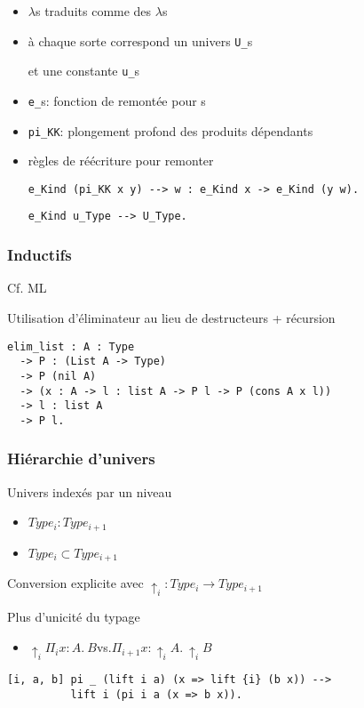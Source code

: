 \documentclass[12pt,aspectratio=169]{beamer}
\begin{document}
\begin{frame}[fragile]
\begin{itemize}
\item<2-> $\lambda$s traduits comme des $\lambda$s 
\item<3-> à chaque sorte  correspond un univers \verb;U_;\sort s
 \parbox{2cm}{\parbox{5cm}{et une constante \texttt{u\_}\sort s}}
\item<4-> \verb;e_;\sort s: fonction de remontée pour \sort s
\item<6-> \verb;pi_KK;: plongement profond des produits dépendants
\item<7-> règles de réécriture pour remonter

\verb;e_Kind (pi_KK x y) --> w : e_Kind x -> e_Kind (y w).;

\verb;e_Kind u_Type --> U_Type.;
\end{itemize}
\end{frame}

\begin{frame}[fragile]
  \frametitle{Inductifs}

  Cf. ML
  \bigskip

  Utilisation d'éliminateur au lieu de destructeurs + récursion

\begin{lstlisting}
elim_list : A : Type
  -> P : (List A -> Type)
  -> P (nil A)
  -> (x : A -> l : list A -> P l -> P (cons A x l))
  -> l : list A
  -> P l.
\end{lstlisting}
  
\end{frame}

\begin{frame}[fragile]
  \frametitle{Hiérarchie d'univers}
  Univers indexés par un niveau

  \begin{itemize}
  \item $Type_i : Type_{i+1}$

  \item $Type_i\subset Type_{i+1}$
  \end{itemize}
  \bigskip
  
  Conversion explicite avec $\uparrow_i : Type_i \to Type_{i+1}$
  \medskip
  
  Plus d'unicité du typage
  \begin{itemize}
  \item $\uparrow_i \Pi_i x:A.~B$\qquad vs.\qquad $\Pi_{i+1}
    x : \uparrow_i A.~\uparrow_i B$
  \end{itemize}
\begin{lstlisting}
[i, a, b] pi _ (lift i a) (x => lift {i} (b x)) -->
          lift i (pi i a (x => b x)).
\end{lstlisting}
  
\end{frame}
\end{document}
